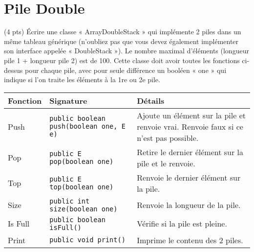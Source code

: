 \documentclass[9pt]{report}
\begin{document}
    \chapter{Pile Double}
    \vspace{-2em}

    \begin{Exercice}{(4 pts)}{}
        Écrire une classe « ArrayDoubleStack » qui implémente 2 piles
        dans un même tableau générique (n’oubliez
        pas que vous devez également implémenter son interface appelée 
        « DoubleStack »). Le nombre maximal d'éléments (longueur pile 1 + 
        longueur pile 2) est de 100.
        Cette classe doit avoir toutes les fonctions ci-dessus pour chaque pile,
        avec pour seule différence un
        booléen « one » qui indique si l'on traite les éléments à la 1re
        ou 2e pile.       
    \end{Exercice}


  \begin{table}[H]

    \begin{center}
      \renewcommand{\arraystretch}{1.5}
      \selectfont
      \footnotesize
          \begin{tabular}{p{2cm} p{3cm} p{4cm}}
          \arrayrulecolor{blue}\hline
          \rowcolor{draculawhite-background}
          \textcolor{myb}{Fonction} & 
          \textcolor{myb}{Signature} & 
          \textcolor{myb}{Détails}  
          \\
          \hline
          \arrayrulecolor{black}
          Push   & 
          \texttt{public boolean push(boolean one, E e)}  
                 &
          Ajoute un élément sur la pile et 
          renvoie vrai. Renvoie faux si ce n'est pas possible.
          \\
          \hline
          Pop   &  
          \texttt{public E pop(boolean one)}  
                &
          Retire le dernier élément sur la pile et le renvoie.
          \\
          \hline
          Top  &
          \texttt{public E top(boolean one)} 
               &
          Renvoie le dernier élément sur la pile.
          \\ 
          \hline
          Size & 
          \texttt{public int size(boolean one)}  
               &
          Renvoie la longueur de la pile.
          \\
          \hline 
          Is Full & 
          \texttt{public boolean isFull()}  
                   &
          Vérifie si la pile est pleine.
          \\
          \hline 
          Print & 
          \texttt{public void print()}  
                    &
          Imprime le contenu des 2 piles.
          \\ 
          \hline
          \end{tabular}
  \end{center}
  \end{table}
\end{document}
